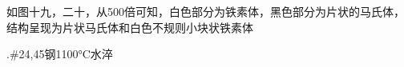 \documentclass[a4paper,utf8]{article}
\begin{document}
如图十九，二十，从500倍可知，白色部分为铁素体，黑色部分为片状的马氏体，结构呈现为片状马氏体和白色不规则小块状铁素体
\begin{figure}[!ht]
    \begin{floatrow}
            
    \end{floatrow}

\end{figure}

.\#24,45钢1100°C水淬
\end{document}
